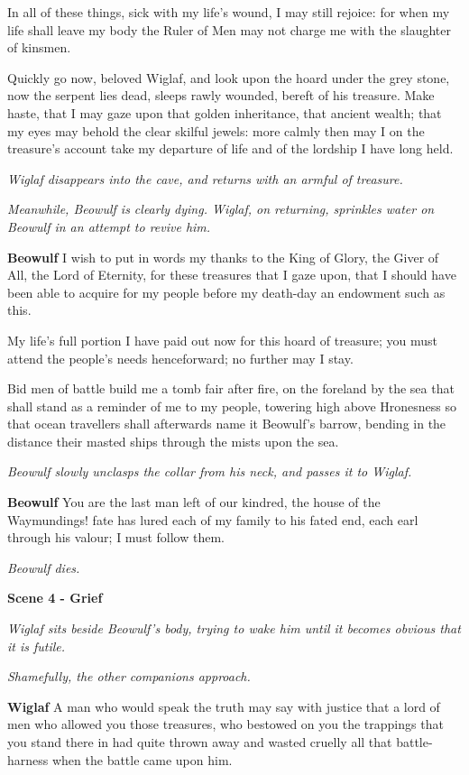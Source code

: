 \documentclass[a4paper]{article}
\begin{document}
{In all of these things,
sick with my life's wound, I may still rejoice:
for when my life shall leave my body
the Ruler of Men may not charge me
with the slaughter of kinsmen.

Quickly go now,
beloved Wiglaf, and look upon the hoard
under the grey stone, now the serpent lies dead,
sleeps rawly wounded, bereft of his treasure.
Make haste, that I may gaze upon that golden inheritance,
that ancient wealth; that my eyes may behold
the clear skilful jewels: more calmly then may I
on the treasure's account take my departure
of life and of the lordship I have long held.

\centerline{\textit{Wiglaf disappears into the cave, and returns with an armful of treasure.}}
\centerline{\textit{Meanwhile, Beowulf is clearly dying. Wiglaf, on returning, 
sprinkles water on Beowulf in an attempt to revive him.}}

\newpage
\textbf{Beowulf} I wish to put in words my thanks
to the King of Glory, the Giver of All,
the Lord of Eternity, for these treasures that I gaze upon,
that I should have been able to acquire for my people
before my death-day an endowment such as this.

My life's full portion I have paid out now
for this hoard of treasure; you must attend the people's
needs henceforward; no further may I stay.

Bid men of battle build me a tomb
fair after fire, on the foreland by the sea
that shall stand as a reminder of me to my people,
towering high above Hronesness
so that ocean travellers shall afterwards name it
Beowulf's barrow, bending in the distance
their masted ships through the mists upon the sea.

\centerline{\textit{Beowulf slowly unclasps the collar from his neck, and passes it to Wiglaf.}}

\textbf{Beowulf} You are the last man left of our kindred,
the house of the Waymundings! fate has lured
each of my family to his fated end,
each earl through his valour; I must follow them.

\centerline{\textit{Beowulf dies.}}

\newpage
\centerline{\textbf{Scene 4 - Grief}}
\centerline{\textit{Wiglaf sits beside Beowulf's body, trying to wake him until it becomes obvious that it is futile.}}
\centerline{\textit{Shamefully, the other companions approach.}}

\textbf{Wiglaf} A man who would speak the truth may say with justice
that a lord of men who allowed you those treasures,
who bestowed on you the trappings that you stand there in
had quite thrown away and wasted cruelly
all that battle-harness when the battle came upon him.

}
\end{document}
